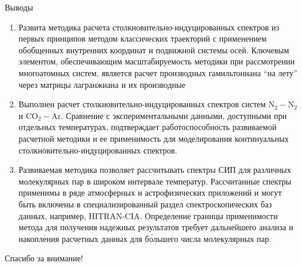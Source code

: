 \documentclass[10pt,usenames,pdf,hyperref={unicode},dvipsnames]{beamer}
\begin{document}
\begin{frame}{Выводы}
    \vspace*{-0.7cm}
    \begin{enumerate}
        \item {\scriptsize Развита методика расчета столкновительно-индуцированных спектров из первых принципов методом классических траекторий с применением обобщенных внутренних координат и подвижной системы осей. Ключевым элементом, обеспечивающим масштабируемость методики при рассмотрении многоатомных систем, является расчет производных гамильтониана \enquote{на лету} через матрицы лагранжиана и их производные}
        \item {\scriptsize Выполнен расчет столкновительно-индуцированных спектров систем N$_2-$N$_2$ и CO$_2-$Ar. Сравнение с экспериментальными данными, доступными при отдельных температурах, подтверждает работоспособность развиваемой расчетной методики и ее применимость для моделирования континуальных столкновительно-индуцированных спектров.}
        \item {\scriptsize Развиваемая методика позволяет рассчитывать спектры СИП для различных молекулярных пар в широком интервале температур. Рассчитанные спектры применимы в  ряде атмосферных и астрофизических приложений и могут быть включены в специализированный раздел спектроскопических баз данных, например, HITRAN-CIA. Определение границы применимости метода для получения надежных результатов требует дальнейшего анализа и накопления расчетных данных для б\'{о}льшего числа молекулярных пар.} 
    \end{enumerate}
\end{frame}

\begin{frame}{}
    \centering
    {\Huge Спасибо за внимание!}
\end{frame}
\end{document}
